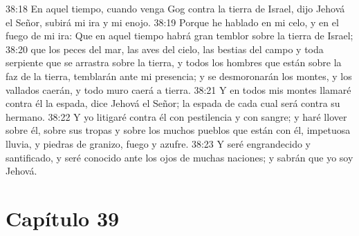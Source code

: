 38:18 En aquel tiempo, cuando venga Gog contra la tierra de Israel, dijo Jehová el Señor, subirá mi ira y mi enojo.   
38:19 Porque he hablado en mi celo, y en el fuego de mi ira: Que en aquel tiempo habrá gran temblor sobre la tierra de Israel; 
38:20 que los peces del mar, las aves del cielo, las bestias del campo y toda serpiente que se arrastra sobre la tierra, y todos los hombres que están sobre la faz de la tierra, temblarán ante mi presencia; y se desmoronarán los montes, y los vallados caerán, y todo muro caerá a tierra.   
38:21 Y en todos mis montes llamaré contra él la espada, dice Jehová el Señor; la espada de cada cual será contra su hermano.   
38:22 Y yo litigaré contra él con pestilencia y con sangre; y haré llover sobre él, sobre sus tropas y sobre los muchos pueblos que están con él, impetuosa lluvia, y piedras de granizo, fuego y azufre.   
38:23 Y seré engrandecido y santificado, y seré conocido ante los ojos de muchas naciones; y sabrán que yo soy Jehová.   
\section*{Capítulo 39  }
  
